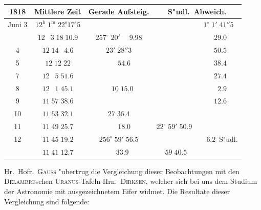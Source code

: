 \documentclass[12pt,a4paper]{article}
\begin{document}
\begin{center}
\small
\begin{tabular}{c|c|c|c|c}
\toprule
1818 & Mittlere Zeit & Gerade Aufsteig. & \multicolumn{2}{c}{S"udl.~Abweich.} \\
\midrule
Juni \phantom{0}3 & $12^{\mathrm{h}}\;1^{\mathrm{m}}\;22^{\mathrm{s}}17^{\mathrm{s}}5$ & & & $1^{\circ}\;1'\;41''5$ \\
& $12\;\phantom{0}3\;18\;10.9$ & $257^{\circ}\;20'\;\phantom{0}\phantom{0}9.98$ & & \phantom{0}\phantom{0}\phantom{0}$\phantom{0}29.0$ \\
\phantom{0}\phantom{0} 4 & $12\;14\;\phantom{0}4.6$ & \phantom{0}\phantom{0}\phantom{0}$23'\;28''3$ & & \phantom{0}\phantom{0}\phantom{0}$\phantom{0}50.5$ \\
\phantom{0}\phantom{0} 5 & $12\;12\;22$ & \phantom{0}\phantom{0}\phantom{0}\phantom{0}$\phantom{0}\phantom{0}\phantom{0}54.6$ & & \phantom{0}\phantom{0}\phantom{0}$\phantom{0}38.4$ \\
\phantom{0}\phantom{0} 7 & $12\;\phantom{0}5\;51.6$ & & & \phantom{0}\phantom{0}\phantom{0}$\phantom{0}27.4$ \\
\phantom{0}\phantom{0} 8 & $12\;\phantom{0}1\;45.1$ & \phantom{0}\phantom{0}$\phantom{0}\phantom{0}10\;15.0$ & & \phantom{0}\phantom{0}\phantom{0}$\phantom{0}\phantom{0}2.9$ \\
\phantom{0}\phantom{0} 9 & $11\;57\;38.6$ & & & \phantom{0}\phantom{0}\phantom{0}$\phantom{0}12.6$ \\
\phantom{0}\phantom{0} 10 & $11\;53\;32.1$ & $27\;36.4$ & & \\
\phantom{0}\phantom{0} 11 & $11\;49\;25.7$ & \phantom{0}\phantom{0}$\phantom{0}\phantom{0}\phantom{0}18.0$ & $22^{\circ}\;59'\;50.9$ & \\
\phantom{0}\phantom{0} 12 & $11\;45\;19.2$ & $256^{\circ}\;59'\;56.5$ & & \phantom{0}\phantom{0}$\phantom{0}\phantom{0}6.2$~S"udl. \\
& $11\;41\;12.7$ & \phantom{0}\phantom{0}\phantom{0}$\phantom{0}\phantom{0}33.9$ & \phantom{0}\phantom{0}$\phantom{0}59\;40.5$ & \\
\bottomrule
\end{tabular}
\end{center}

Hr.~Hofr.~\textsc{Gauss} "ubertrug die Vergleichung dieser Beobachtungen mit den \textsc{Delambre}schen
\textsc{Uranus}-Tafeln Hrn.~\textsc{Dirksen}, welcher sich bei uns dem Studium der Astronomie mit ausgezeichnetem
Eifer widmet. Die Resultate dieser Vergleichung sind folgende:
\end{document}

